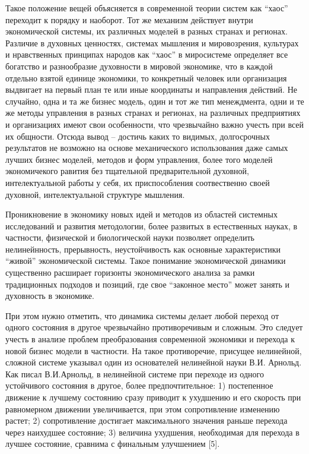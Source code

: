 \begin{multicols}{2}
Такое положение вещей объясняется в современной теории систем как
``хаос'' переходит к порядку и наоборот. Тот же механизм действует
внутри экономической системы, их различных моделей в разных странах и
регионах. Различие в духовных ценностях, системах мышления и
мировозрения, культурах и нравственных принципах народов как ``хаос'' в
миросистеме определяет все богатство и разнообразие духовности в мировой
экономике, что в каждой отдельно взятой единице экономики, то конкретный
человек или организация выдвигает на первый план те или иные координаты
и направления действий. Не случайно, одна и та же бизнес модель, один и
тот же тип менеждмента, одни и те же методы управления в разных странах
и регионах, на различных предприятиях и организациях имеют свои
особенности, что чрезвычайно важно учесть при всей их общности. Отсюда
вывод -- достичь каких то видимых, долгосрочных результатов не возможно
на основе механического использования даже самых лучших бизнес моделей,
методов и форм управления, более того моделей экономичекого равития без
тщательной предварительной духовной, интелектуальной работы у себя, их
приспособления соотвественно своей духовной, интелектуальной структуре
мышления.

Проникновение в экономику новых идей и методов из областей системных
исследований и развития методологии, более развитых в естественных
науках, в частности, физической и биологической науки позволяет
определить нелинейнность, прерывность, неустойчивость как основные
характеристики ``живой'' экономической системы. Такое понимание
экономической динамики существенно расширает горизонты экономического
анализа за рамки традиционных подходов и позиций, где свое ``законное
место'' может занять и духовность в экономике.

При этом нужно отметить, что динамика системы делает любой переход от
одного состояния в другое чрезвычайно противоречивым и сложным. Это
следует учесть в анализе проблем преобразования современной экономики и
перехода к новой бизнес модели в частности. На такое противоречие,
присущее нелинейной, сложной системе указывал один из основателей
нелинейной науки В.И. Арнольд. Как писал В.И.Арнольд, в нелинейной
системе при переходе из одного устойчивого состояния в другое, более
предпочтительное: 1) постепенное движение к лучшему состоянию сразу
приводит к ухудшению и его скорость при равномерном движении
увеличивается, при этом сопротивление изменению растет; 2) сопротивление
достигает максимального значения раньше перехода через наихудшее
состояние; 3) величина ухудшения, необходимая для перехода в лучшее
состояние, сравнима с финальным улучшением {[}5{]}.


\end{multicols}
